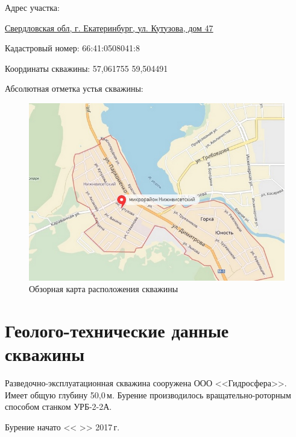 \documentclass[a4paper,12pt]{article} %
\newcommand{\txtExecutor}{ООО <<Гидросфера>>}			%
\newcommand{\txtYear}{2017}			%
\newcommand{\txtAddress}{Свердловская обл, г. Екатеринбург, ул. Кутузова, дом 47}
\newcommand{\txtHeight}{ }							%
\newcommand{\txtCadaster}{66:41:0508041:8} 			%
\newcommand{\txtCoords}{57,061755 59,504491}		%
\newcommand{\txtDepth}{50,0}						%
\begin{document}
	\bigskip
	
	Адрес участка: 

	\underline{\txtAddress}

	\bigskip

	
	Кадастровый номер: \txtCadaster

	Координаты скважины: \txtCoords
	
	Абсолютная отметка устья скважины: \txtHeight

	\begin{figure}[h]
	\includegraphics[width=\textwidth]{map.jpg}
	\caption{Обзорная карта расположения скважины}
	\end{figure}

    \section*{Геолого-технические данные скважины}

    Разведочно-эксплуатационная скважина сооружена \txtExecutor. Имеет общую глубину \txtDepth \,м.   Бурение производилось вращательно-роторным способом станком УРБ-2-2А.

    \bigskip

    Бурение начато << >> \txtYear \,г. 
\end{document}
